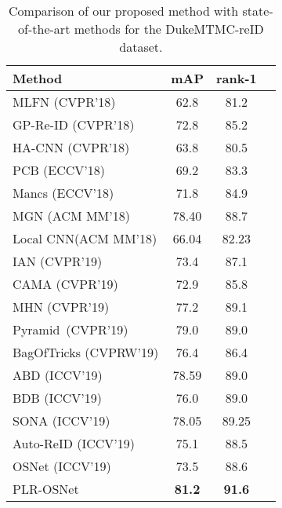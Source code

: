 \documentclass[journal]{IEEEtran}
\begin{document}
\begin{table}
\begin{center}
\label{my-label}
\begin{tabular}{l||ccc}
\toprule[1.5pt]
Method     & mAP & rank-1   \\\hline
MLFN \cite{chang2018MFN}(CVPR'18)     & 62.8 & 81.2   \\
GP-Re-ID \cite{almazan2018re} (CVPR'18)  & 72.8 & 85.2 \\
HA-CNN \cite{li2018harmonious}(CVPR'18)  & 63.8 & 80.5 \\
PCB \cite{sun2018beyond} (ECCV'18)       & 69.2 & 83.3  \\
Mancs (ECCV'18)                           & 71.8 & 84.9  \\
MGN \cite{wang2018MGN}(ACM MM'18) & 78.40 & 88.7 \\
Local CNN\cite{yang2018LCNN}(ACM MM'18) & 66.04 & 82.23 \\
IAN \cite{hou2019IAN} (CVPR'19)       & 73.4 & 87.1  \\
CAMA \cite{yang2019CAMA} (CVPR'19)       & 72.9 & 85.8 \\
MHN \cite{chen2019MHN} (CVPR'19)       & 77.2 & 89.1  \\
Pyramid~\cite{zheng2019pyramid}(CVPR'19) & 79.0 &89.0 \\
BagOfTricks (CVPRW'19)                   & 76.4 & 86.4 \\
ABD \cite{chen2019ABD} (ICCV'19)       & 78.59 &89.0  \\
BDB \cite{dai2019BDB} (ICCV'19)       & 76.0 & 89.0  \\
SONA \cite{xia2019SONA} (ICCV'19)       & 78.05 &89.25 \\
Auto-ReID \cite{quan2019Auto} (ICCV'19)                     & 75.1 &88.5 \\
OSNet\cite{zhou2019OSNet} (ICCV'19)                                & 73.5 & 88.6 \\ \hline
PLR-OSNet       & \bf81.2 & \bf91.6 \\
\bottomrule[1.5pt]
\end{tabular}
\end{center}
\caption{Comparison of our proposed method with state-of-the-art methods for the DukeMTMC-reID dataset.}
\label{tb:Duke}
\end{table}
\end{document}
